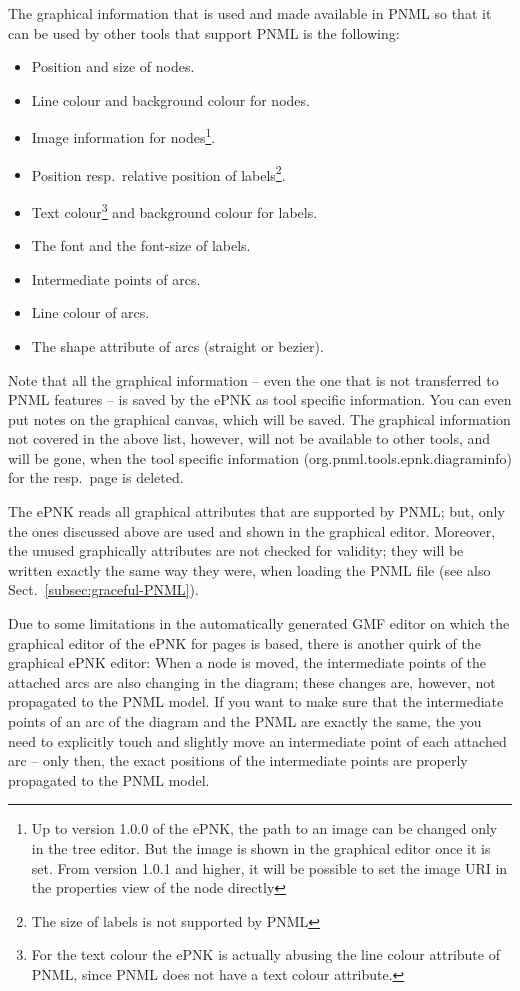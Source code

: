 The graphical information that is used and made available in PNML
so that it can be used by other tools that support PNML is the following:
\begin{itemize}
  \item Position and size of nodes.
  \item Line colour and background colour for nodes.
  \item Image information for nodes\footnote
          {Up to version 1.0.0 of the ePNK, the path to an image can be changed
          only in the tree editor. But the image is shown in the graphical editor
          once it is set. From version 1.0.1 and higher, it will be possible to
          set the image URI in the properties view of the node directly}.
  \item Position resp.\ relative position of labels\footnote
          {The size of labels is not supported by PNML}.
  \item Text colour\footnote
          {For the text colour the ePNK is actually abusing the line colour
           attribute of PNML, since PNML does not have a text colour
           attribute.}
        and background colour for labels.
  \item The font and the font-size of labels.
  \item Intermediate points of arcs.
  \item Line colour of arcs.
  \item The shape attribute of arcs (straight or bezier).
\end{itemize}

Note that all the graphical information -- even the one that is not transferred
to PNML features -- is saved by the ePNK as tool specific information. You can
even put notes on the graphical canvas, which will be saved. The graphical
information not covered in the above list, however, will not be available to
other tools, and will be gone, when the tool specific information
(org.pnml.tools.epnk.diagraminfo) for the resp.\ page is deleted.

The ePNK reads all graphical attributes that are supported by PNML;
but, only the ones discussed above are used and shown in the graphical editor.
Moreover, the unused graphically attributes are not checked for
validity; they will be written exactly the same way they were, when
loading the PNML file (see also Sect.~\ref{subsec:graceful-PNML}).

Due to some limitations in the automatically generated GMF editor on which
the graphical editor of the ePNK for pages is based, there is another quirk
of the graphical ePNK editor: When a node is moved, the intermediate points of
the attached arcs are also changing in the diagram; these changes are, however,
not propagated to the PNML model. If you want to make sure that the
intermediate points of an arc of the diagram and the PNML are exactly the same,
the you need to explicitly touch and slightly move an intermediate point of each
attached arc -- only then, the exact positions of the intermediate points
are properly propagated to the PNML model.

